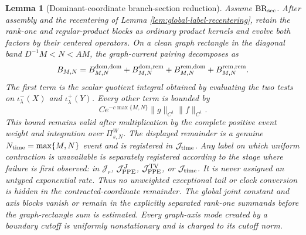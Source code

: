 \documentclass[11pt]{article}
\newtheorem{lemma}[theorem]{Lemma}
\begin{document}
\begin{lemma}[Dominant-coordinate branch-section reduction]
\label{lem:dominant-coordinate-reduction}
Assume $\mathrm{BR}_{\rm sec}$.  After assembly and the recentering of Lemma
\ref{lem:global-label-recentering}, retain the rank-one and regular-product
blocks as ordinary product kernels and evolve both factors by their centered
operators.
On a clean graph rectangle in the diagonal band
$D^{-1}M<N<AM$, the graph-current pairing decomposes as
\begin{equation}
\label{eq:dominant-coordinate-decomposition}
 B_{M,N}=B^{\rm dom,dom}_{M,N}
 +B^{\rm dom,rem}_{M,N}+B^{\rm rem,dom}_{M,N}
 +B^{\rm rem,rem}_{M,N}.
\end{equation}
The first term is the scalar quotient integral obtained by evaluating the two
tests on $\iota^-_\lambda(X)$ and $\iota^+_\lambda(Y)$.
Every other term is bounded by
\begin{equation}
\label{eq:contracted-coordinate-error}
 Ce^{-c\max\{M,N\}}\|g\|_{C^1}\|f\|_{C^1}.
\end{equation}
This bound remains valid after multiplication by the complete positive event
weight and integration over $\Pi_{s,N}^{W}$.  The displayed remainder is a
genuine $N_{\rm time}=\max\{M,N\}$ event and is registered in
$\mathcal J_{\rm time}$.  Any label on which uniform contraction is
unavailable is separately registered according to the stage where failure
is first observed: in $\mathcal J_r$, $\mathcal J_{\rm PPE}^{J}$,
$\mathcal J_{\rm PPE}^{\rm TV}$, or $\mathcal J_{\rm time}$.  It is never
assigned an untyped exponential rate.  Thus no unweighted exceptional tail
or clock conversion is hidden in the contracted-coordinate remainder.
The global joint constant and axis blocks vanish or remain in the explicitly
separated rank-one summands before the graph-rectangle sum is estimated.
Every graph-axis mode created by a boundary cutoff is uniformly
nonstationary and is charged to its cutoff norm.
\end{lemma}
\end{document}
